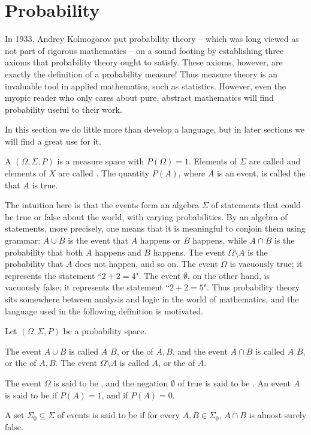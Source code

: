 \section{Probability}
In 1933, Andrey Kolmogorov put probability theory -- which was long viewed as not part of rigorous mathematics -- on a sound footing by establishing three axioms that probability theory ought to satisfy.
These axioms, however, are exactly the definition of a probability measure!
Thus measure theory is an invaluable tool in applied mathematics, such as statistics.
However, even the myopic reader who only cares about pure, abstract mathematics will find probability useful to their work.

In this section we do little more than develop a language, but in later sections we will find a great use for it.

\begin{definition}
A  $(\Omega, \Sigma, P)$ is a measure space with $P(\Omega) = 1$.
Elements of $\Sigma$ are called  and elements of $X$ are called .
The quantity $P(A)$, where $A$ is an event, is called the  that $A$ is true.
\end{definition}

\begin{subsec}
The intuition here is that the events form an algebra $\Sigma$ of statements that could be true or false about the world, with varying probabilities.
By an algebra of statements, more precisely, one means that it is meaningful to conjoin them using grammar: $A \cup B$ is the event that $A$ happens or $B$ happens, while $A \cap B$ is the probability that both $A$ happens and $B$ happens. The event $\Omega \setminus A$ is the probability that $A$ does not happen, and so on.
The event $\Omega$ is vacuously true; it represents the statement ``$2 + 2 = 4$".
The event $\emptyset$, on the other hand, is vacuously false; it represents the statement ``$2 + 2 = 5$".
Thus probability theory sits somewhere between analysis and logic in the world of mathematics, and the language used in the following definition is motivated.
\end{subsec}

\begin{definition}
Let $(\Omega, \Sigma, P)$ be a probability space.

The event $A \cup B$ is called $A$  $B$, or the  of $A,B$, and the event $A \cap B$ is called $A$  $B$, or the  of $A,B$.
The event $\Omega \setminus A$ is called  $A$, or the  of $A$.

The event $\Omega$ is said to be , and the negation $\emptyset$ of true is said to be .
An event $A$ is said to be  if $P(A) = 1$, and  if $P(A) = 0$.

A set $\Sigma_0 \subseteq \Sigma$ of events is said to be  if for every $A, B \in \Sigma_0$, $A \cap B$ is almost surely false.
\end{definition}

